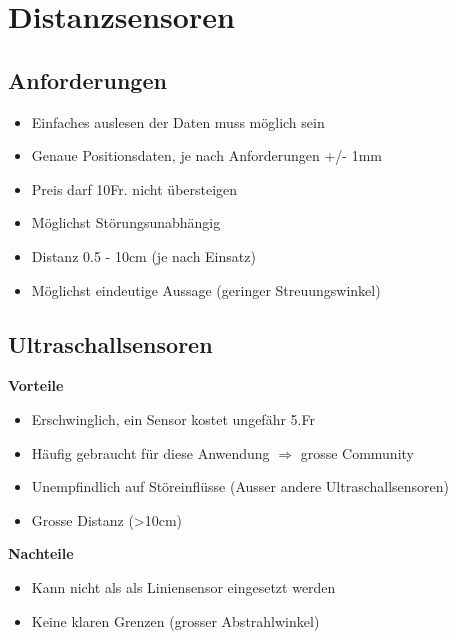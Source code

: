 \section{Distanzsensoren}
\subsection{Anforderungen}
\begin{itemize}
\item Einfaches auslesen der Daten muss möglich sein
\item Genaue Positionsdaten, je nach Anforderungen +/- 1mm
\item Preis darf 10Fr. nicht übersteigen
\item Möglichst Störungsunabhängig
\item Distanz 0.5 - 10cm (je nach Einsatz)
\item Möglichst eindeutige Aussage (geringer Streuungswinkel)
\end{itemize}

\subsection{Ultraschallsensoren}
\textbf {Vorteile}
\begin{itemize}
\item Erschwinglich, ein Sensor kostet ungefähr 5.Fr
\item Häufig gebraucht für diese Anwendung $\Rightarrow$ grosse Community
\item Unempfindlich auf Störeinflüsse (Ausser andere Ultraschallsensoren)
\item Grosse Distanz (>10cm)\\
\end{itemize}
\textbf {Nachteile}
\begin{itemize}
\item Kann nicht als als Liniensensor eingesetzt werden
\item Keine klaren Grenzen (grosser Abstrahlwinkel)
\end{itemize}

